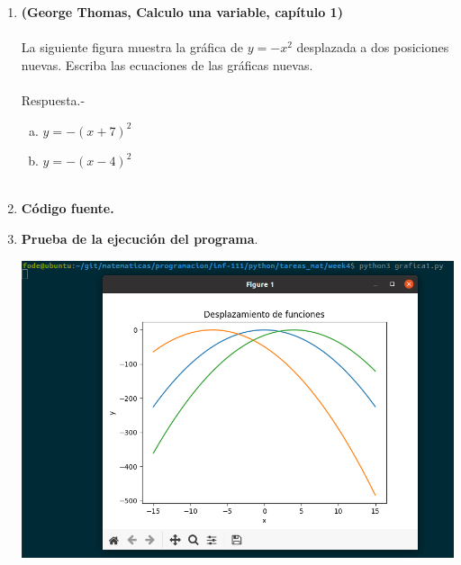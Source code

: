\begin{enumerate}
\begin{enumerate}[\bfseries a)]
	\item \textbf{(George Thomas, Calculo una variable, capítulo 1)}\\\\ 
	La siguiente figura muestra la gráfica de $y = -x^2$ desplazada a dos posiciones nuevas. Escriba las ecuaciones de las gráficas nuevas.\\\\
	    Respuesta.-\; 
	    \begin{enumerate}[a)]
		\item $y=-(x+7)^2$\\
		\item $y=-(x-4)^2$\\\\
	    \end{enumerate}


	\item \textbf{Código fuente.}\\ 
	    
	    
	    \vspace{.5cm}
	
	\item \textbf{Prueba de la ejecución del programa}.\\
	    \begin{center}
		\includegraphics[scale=.4]{imagenes/tareas_mat/week4/grafica1.png}
	    \end{center}

    \end{enumerate}

\newpage


\end{enumerate}
